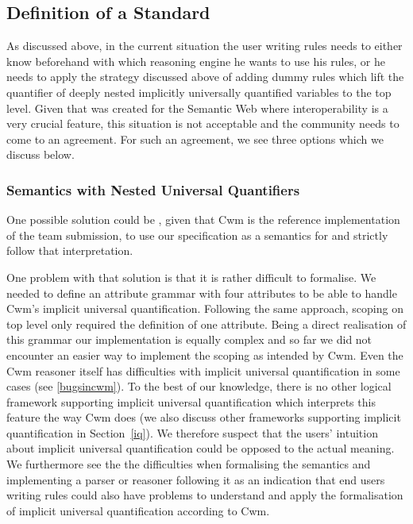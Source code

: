 \subsection{Definition of a Standard}
As discussed above, in the current situation the user writing rules needs to either know beforehand with which reasoning engine he wants to use his rules, or he needs to apply the strategy discussed 
above of adding dummy rules which lift the quantifier of deeply nested implicitly universally quantified variables to the top level. 
Given that \nthreelogic was created for the Semantic Web where interoperability is a very crucial feature, this situation is not acceptable and  
the community needs to come to an agreement. For such an agreement, we see three options which we discuss below.
\subsubsection{Semantics with Nested Universal Quantifiers}
One possible solution could be , given that Cwm is the reference implementation of the \wwwc team submission,
to use our specification as a semantics for \nthree and strictly follow that
interpretation. 

One problem with that solution is that it is rather difficult to formalise. 
We needed to define an attribute grammar with four attributes to be able to handle Cwm's implicit universal 
quantification. Following the same approach, scoping on top level only required the definition of one attribute. 
Being a direct realisation of this grammar our implementation is equally complex and so far we did not  encounter an easier way 
to implement the scoping as intended by Cwm.
Even the Cwm reasoner itself has difficulties with implicit universal quantification in some cases (see \ref{bugsincwm}).
To the best of our knowledge, there is no other logical framework supporting implicit universal quantification
which interprets this feature the way Cwm does (we also discuss other frameworks supporting implicit quantification in Section~\ref{iq}).
We therefore suspect that the users' intuition about implicit universal quantification could be opposed to the actual meaning. %
We furthermore see the
the difficulties when formalising the semantics and implementing a parser or reasoner following it as an indication that end users writing \nthree rules 
could also have problems to 
understand and apply the formalisation of implicit universal quantification according to Cwm. %

